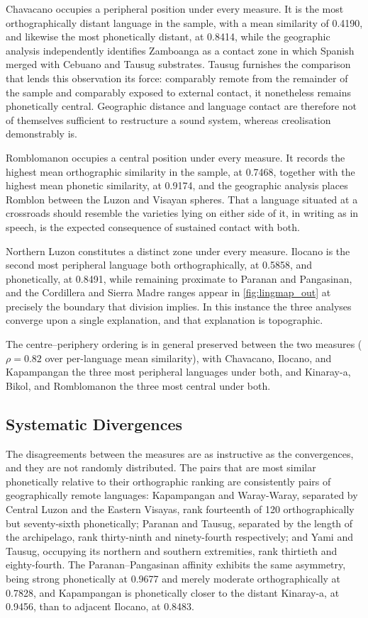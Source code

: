 Chavacano occupies a peripheral position under every measure. It is the most
orthographically distant language in the sample, with a mean similarity of
0.4190, and likewise the most phonetically distant, at 0.8414, while the
geographic analysis independently identifies Zamboanga as a contact zone in
which Spanish merged with Cebuano and Tausug substrates. Tausug furnishes the
comparison that lends this observation its force: comparably remote from the
remainder of the sample and comparably exposed to external contact, it
nonetheless remains phonetically central. Geographic distance and language
contact are therefore not of themselves sufficient to restructure a sound
system, whereas creolisation demonstrably is.

Romblomanon occupies a central position under every measure. It records the
highest mean orthographic similarity in the sample, at 0.7468, together with the
highest mean phonetic similarity, at 0.9174, and the geographic analysis places
Romblon between the Luzon and Visayan spheres. That a language situated at a
crossroads should resemble the varieties lying on either side of it, in writing
as in speech, is the expected consequence of sustained contact with both.

Northern Luzon constitutes a distinct zone under every measure. Ilocano is the
second most peripheral language both orthographically, at 0.5858, and
phonetically, at 0.8491, while remaining proximate to Paranan and Pangasinan,
and the Cordillera and Sierra Madre ranges appear in \cref{fig:lingmap_out} at
precisely the boundary that division implies. In this instance the three
analyses converge upon a single explanation, and that explanation is
topographic.

The centre--periphery ordering is in general preserved between the two measures
(\( \rho = 0.82 \) over per-language mean similarity), with Chavacano, Ilocano,
and Kapampangan the three most peripheral languages under both, and Kinaray-a,
Bikol, and Romblomanon the three most central under both.

\subsection{Systematic Divergences}

The disagreements between the measures are as instructive as the convergences,
and they are not randomly distributed. The pairs that are most similar
phonetically relative to their orthographic ranking are consistently pairs of
geographically remote languages: Kapampangan and Waray-Waray, separated by
Central Luzon and the Eastern Visayas, rank fourteenth of 120 orthographically
but seventy-sixth phonetically; Paranan and Tausug, separated by the length of
the archipelago, rank thirty-ninth and ninety-fourth respectively; and Yami and
Tausug, occupying its northern and southern extremities, rank thirtieth and
eighty-fourth. The Paranan--Pangasinan affinity exhibits the same asymmetry,
being strong phonetically at 0.9677 and merely moderate orthographically at
0.7828, and Kapampangan is phonetically closer to the distant Kinaray-a, at
0.9456, than to adjacent Ilocano, at 0.8483.

